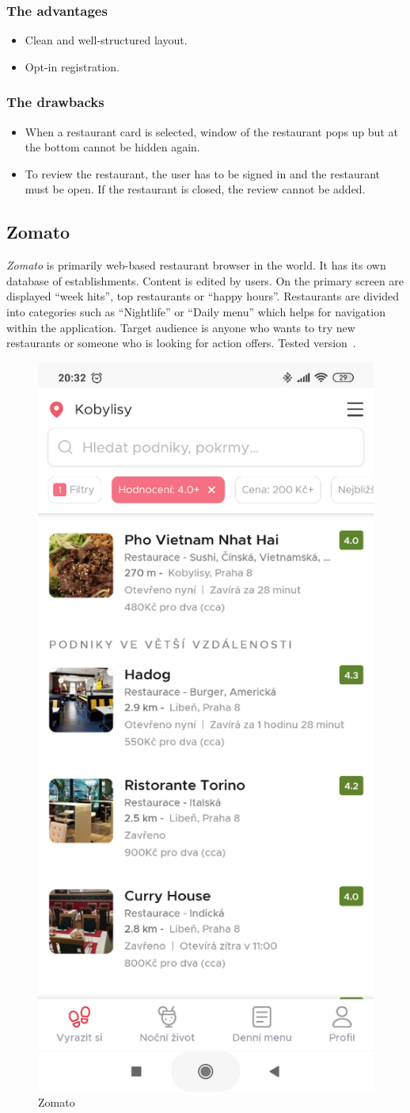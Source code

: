 \subsubsection{The advantages}
\begin{itemize}
    \item Clean and well-structured layout.
    \item Opt-in registration.
\end{itemize}

\subsubsection{The drawbacks}
\begin{itemize}
    \item When a restaurant card is selected, window of the restaurant pops up but at the bottom cannot be hidden again.
    \item To review the restaurant, the user has to be signed in and the restaurant must be open. If the restaurant is closed, the review cannot be added.
\end{itemize}

\subsection{Zomato}
\textit{Zomato} is primarily web-based restaurant browser in the world. It has its own database of establishments. Content is edited by users.  
On the primary screen are displayed ``week hits'', top restaurants or ``happy hours''. Restaurants are divided into categories such as ``Nightlife'' or ``Daily menu'' which helps for navigation within the application.
Target audience is anyone who wants to try new restaurants or someone who is looking for action offers. Tested version~\cite{app-zomato}.

\begin{figure}[ht]
    \centering
    \includegraphics[width=0.33\linewidth]{img/analysis/zomato.png}
    \caption{Zomato}
    \label{fig:zomato}
\end{figure}

